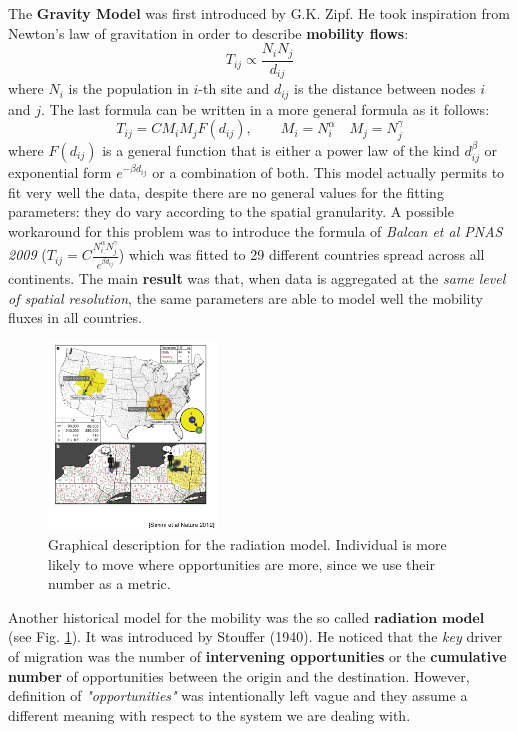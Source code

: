\documentclass[../main/main.tex]{subfiles}
\begin{document}
The \textbf{Gravity Model} was first introduced by G.K. Zipf. He took inspiration from Newton's law of gravitation in order to describe \textbf{mobility flows}:
\begin{equation}
    T_{ij} \propto \frac{N_i N_j}{d_{ij}}
\end{equation}
where $N_i$ is the population in $i$-th site and $d_{ij}$ is the distance between nodes $i$ and $j$. The last formula can be written in a more general formula as it follows:
\begin{equation}
    T_{ij} = C M_i M_j F(d_{ij}), \qquad M_i = N_i^\alpha \quad M_j = N_j^\gamma
\end{equation}
where $F(d_{ij})$ is a general function that is either a power law of the kind $d_{ij}^\beta$ or exponential form $e^{-\beta d_{ij}}$ or a combination of both.
This model actually permits to fit very well the data, despite there are no general values for the fitting parameters: they do vary according to the spatial granularity. A possible workaround for this problem was to introduce the formula of \textit{Balcan et al PNAS 2009} ($T_{ij} = C \frac{N_i^\alpha N_j^\gamma}{e^{\beta d_{ij}}}$) which was fitted to 29 different countries spread across all continents.
The main \textbf{result} was that, when data is aggregated at the \textit{same level of spatial resolution}, the same parameters are able to model well the mobility fluxes in all countries.

\begin{figure}[h!]
\centering
\includegraphics[width=0.4\textwidth]{../lessons/image/14/image04.png}
\caption{\label{fig:13_04} Graphical description for the radiation model. Individual is more likely to move where opportunities are more, since we use their number as a metric.}
\end{figure}

Another historical model for the mobility was the so called $\textbf{radiation model}$ (see Fig. \ref{fig:13_04}). It was introduced by Stouffer (1940). He noticed that the \textit{key} driver of migration was the number of \textbf{intervening opportunities} or the \textbf{cumulative number} of opportunities between the origin and the destination. However, definition of \textit{"opportunities"} was intentionally left vague and they assume a different meaning with respect to the system we are dealing with.
\end{document}
